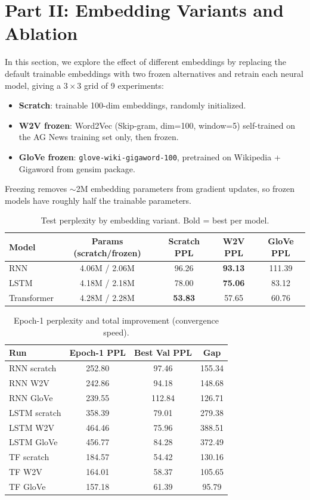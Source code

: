 \documentclass[11pt,a4paper]{article}
\begin{document}
\section{Part II: Embedding Variants and Ablation}

In this section, we explore the effect of different embeddings by replacing the default trainable embeddings with two frozen alternatives and retrain each neural model, giving a $3 \times 3$ grid of 9 experiments:

\begin{itemize}[nosep]
\item \textbf{Scratch}: trainable 100-dim embeddings, randomly initialized.
\item \textbf{W2V frozen}: Word2Vec (Skip-gram, dim=100, window=5) self-trained on the AG News training set only, then frozen.
\item \textbf{GloVe frozen}: \texttt{glove-wiki-gigaword-100}, pretrained on Wikipedia + Gigaword from gensim package.
\end{itemize}

Freezing removes $\sim$2M embedding parameters from gradient updates, so frozen models have roughly half the trainable parameters.

\begin{table}[H]
\centering\small
\begin{tabular}{lcccc}
\toprule
\textbf{Model} & \textbf{Params (scratch/frozen)} & \textbf{Scratch PPL} & \textbf{W2V PPL} & \textbf{GloVe PPL} \\
\midrule
RNN & 4.06M / 2.06M & 96.26 & \textbf{93.13} & 111.39 \\
LSTM & 4.18M / 2.18M & 78.00 & \textbf{75.06} & 83.12 \\
Transformer & 4.28M / 2.28M & \textbf{53.83} & 57.65 & 60.76 \\
\bottomrule
\end{tabular}
\caption{Test perplexity by embedding variant. Bold = best per model.}
\end{table}

\begin{table}[H]
\centering\small
\begin{tabular}{lccc}
\toprule
\textbf{Run} & \textbf{Epoch-1 PPL} & \textbf{Best Val PPL} & \textbf{Gap} \\
\midrule
RNN scratch & 252.80 & 97.46 & 155.34 \\
RNN W2V & 242.86 & 94.18 & 148.68 \\
RNN GloVe & 239.55 & 112.84 & 126.71 \\
LSTM scratch & 358.39 & 79.01 & 279.38 \\
LSTM W2V & 464.46 & 75.96 & 388.51 \\
LSTM GloVe & 456.77 & 84.28 & 372.49 \\
TF scratch & 184.57 & 54.42 & 130.16 \\
TF W2V & 164.01 & 58.37 & 105.65 \\
TF GloVe & 157.18 & 61.39 & 95.79 \\
\bottomrule
\end{tabular}
\caption{Epoch-1 perplexity and total improvement (convergence speed).}
\end{table}
\end{document}
